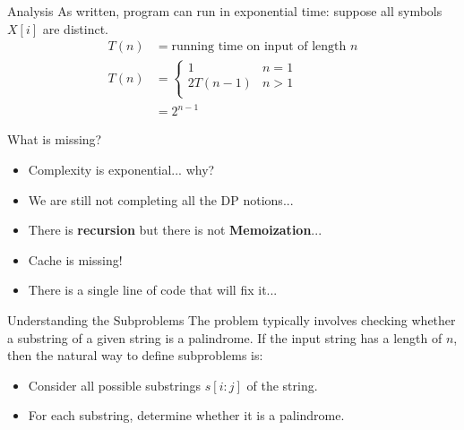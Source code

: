 \documentclass[aspectratio=169]{beamer}
\begin{document}

\begin{frame}{Analysis}
    As written, program can run in exponential time: suppose all symbols $X[i]$ are distinct.
    \begin{equation*}
        \begin{align*}
            T(n) &= \text{running time on input of length } n \\
            T(n) &=
                    \begin{cases}
                        1         & n = 1 \\
                        2T(n - 1) & n > 1 \\
                    \end{cases} \\
                 &= 2^{n - 1}
        \end{align*}
    \end{equation*}
\end{frame}

\begin{frame}{What is missing?}
    \begin{itemize}
        \item Complexity is exponential... why? \pause
        \item We are still not completing all the DP notions...
        \item There is \textbf{recursion} but there is not \textbf{Memoization}... \pause
        \item Cache is missing!
        \item There is a single line of code that will fix it...
    \end{itemize}
\end{frame}

\begin{frame}{Understanding the Subproblems}
    The problem typically involves checking whether a substring of a given string is a palindrome. If the input string has a length of \( n \), then the natural way to define subproblems is:
    \begin{itemize}
        \item Consider all possible substrings $s[i:j]$ of the string.
        \item For each substring, determine whether it is a palindrome.
    \end{itemize}
\end{frame}
\end{document}
